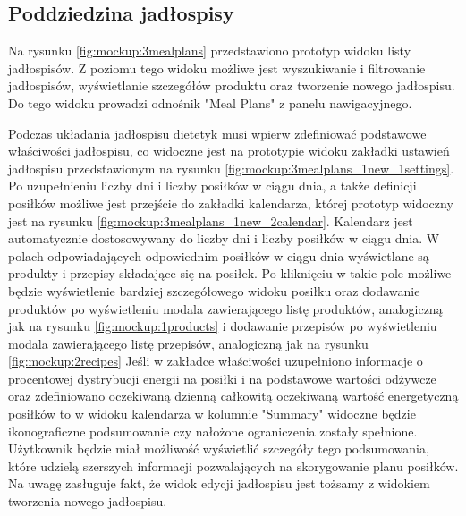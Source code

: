 


\subsection{Poddziedzina jadłospisy}

Na rysunku \ref{fig:mockup:3mealplans} przedstawiono prototyp widoku listy jadłospisów.
Z poziomu tego widoku możliwe jest wyszukiwanie i filtrowanie jadłospisów, wyświetlanie szczegółów produktu oraz tworzenie nowego jadłospisu.
Do tego widoku prowadzi odnośnik "Meal Plans" z panelu nawigacyjnego.


Podczas układania jadłospisu dietetyk musi wpierw zdefiniować podstawowe właściwości jadłospisu, co widoczne jest na prototypie widoku zakładki ustawień jadłospisu przedstawionym na rysunku \ref{fig:mockup:3mealplans_1new_1settings}.
Po uzupełnieniu liczby dni i liczby posiłków w ciągu dnia, a także definicji posiłków możliwe jest przejście do zakładki kalendarza, której prototyp widoczny jest na rysunku \ref{fig:mockup:3mealplans_1new_2calendar}.
Kalendarz jest automatycznie dostosowywany do liczby dni i liczby posiłków w ciągu dnia.
W polach odpowiadających odpowiednim posiłków w ciągu dnia wyświetlane są produkty i przepisy składające się na posiłek.
Po kliknięciu w takie pole możliwe będzie wyświetlenie bardziej szczegółowego widoku posiłku
oraz dodawanie produktów po wyświetleniu modala zawierającego listę produktów, analogiczną jak na rysunku \ref{fig:mockup:1products}
i dodawanie przepisów po wyświetleniu modala zawierającego listę przepisów, analogiczną jak na rysunku \ref{fig:mockup:2recipes}
Jeśli w zakładce właściwości uzupełniono informacje o procentowej dystrybucji energii na posiłki i na podstawowe wartości odżywcze
oraz zdefiniowano oczekiwaną dzienną całkowitą oczekiwaną wartość energetyczną posiłków
to w widoku kalendarza w kolumnie "Summary" widoczne będzie ikonograficzne podsumowanie czy nałożone ograniczenia zostały spełnione.
Użytkownik będzie miał możliwość wyświetlić szczegóły tego podsumowania, które udzielą szerszych informacji pozwalających na skorygowanie planu posiłków.
Na uwagę zasługuje fakt, że widok edycji jadłospisu jest tożsamy z widokiem tworzenia nowego jadłospisu.

